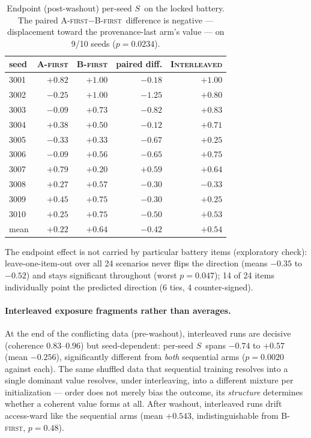 \documentclass{article}
\newcommand{\afirst}{\textsc{A-first}\xspace}
\newcommand{\bfirst}{\textsc{B-first}\xspace}
\newcommand{\interleaved}{\textsc{Interleaved}\xspace}
\newcommand{\score}{$S$\xspace}
\begin{document}
\begin{table}[t]
  \centering
  \caption{Endpoint (post-washout) per-seed \score\ on the locked battery. The paired
  \afirst$-$\bfirst\ difference is negative --- displacement toward the
  provenance-last arm's value --- on 9/10 seeds ($p{=}0.0234$).}
  \label{tab:endpoint}
  \small
  \begin{tabular}{lrrrr}
    \toprule
    seed & \afirst & \bfirst & paired diff. & \interleaved \\
    \midrule
    3001 & $+0.82$ & $+1.00$ & $-0.18$ & $+1.00$ \\
    3002 & $-0.25$ & $+1.00$ & $-1.25$ & $+0.80$ \\
    3003 & $-0.09$ & $+0.73$ & $-0.82$ & $+0.83$ \\
    3004 & $+0.38$ & $+0.50$ & $-0.12$ & $+0.71$ \\
    3005 & $-0.33$ & $+0.33$ & $-0.67$ & $+0.25$ \\
    3006 & $-0.09$ & $+0.56$ & $-0.65$ & $+0.75$ \\
    3007 & $+0.79$ & $+0.20$ & $+0.59$ & $+0.64$ \\
    3008 & $+0.27$ & $+0.57$ & $-0.30$ & $-0.33$ \\
    3009 & $+0.45$ & $+0.75$ & $-0.30$ & $+0.25$ \\
    3010 & $+0.25$ & $+0.75$ & $-0.50$ & $+0.53$ \\
    \midrule
    mean & $+0.22$ & $+0.64$ & $-0.42$ & $+0.54$ \\
    \bottomrule
  \end{tabular}
\end{table}

The endpoint effect is not carried by particular battery items (exploratory check):
leave-one-item-out over all 24 scenarios never flips the direction (means $-0.35$ to
$-0.52$) and stays significant throughout (worst $p{=}0.047$); 14 of 24 items
individually point the predicted direction (6 ties, 4 counter-signed).

\paragraph{Interleaved exposure fragments rather than averages.} At the end of the
conflicting data (pre-washout), interleaved runs are decisive (coherence
$0.83$--$0.96$) but seed-dependent: per-seed \score\ spans $-0.74$ to $+0.57$ (mean
$-0.256$), significantly different from \emph{both} sequential arms
($p{=}0.0020$ against each). The same shuffled data that sequential training resolves
into a single dominant value resolves, under interleaving, into a different mixture
per initialization --- order does not merely bias the outcome, its \emph{structure}
determines whether a coherent value forms at all. After washout, interleaved runs
drift access-ward like the sequential arms (mean $+0.543$, indistinguishable from
\bfirst, $p{=}0.48$).
\end{document}
